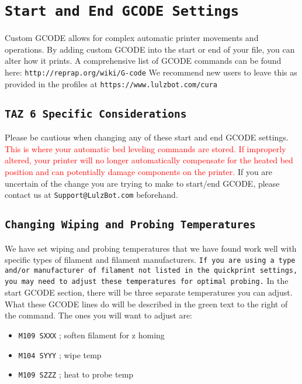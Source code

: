 \section{\texttt{Start and End GCODE Settings}}
Custom GCODE allows for complex automatic printer movements and operations. By adding custom GCODE into the start or end of your file, you can alter how it prints. A comprehensive list of GCODE commands can be found here: \texttt{http://reprap.org/wiki/G-code} We recommend new users to leave this as provided in the profiles at \texttt{https://www.lulzbot.com/cura}

\subsection{\texttt{TAZ 6 Specific Considerations}}
Please be cautious when changing any of these start and end GCODE settings. \textcolor{red}{This is where your automatic bed leveling commands are stored. If improperly altered, your printer will no longer automatically compensate for the heated bed position and can potentially damage components on the printer.} If you are uncertain of the change you are trying to make to start/end GCODE, please contact us at \texttt{Support@LulzBot.com} beforehand.


\subsection{\texttt{Changing Wiping and Probing Temperatures}} \label{sssec:num1}
We have set wiping and probing temperatures that we have found work well with specific types of filament and filament manufacturers. \texttt{If you are using a type and/or manufacturer of filament not listed in the quickprint settings, you may need to adjust these temperatures for optimal probing.} In the start GCODE section, there will be three separate temperatures you can adjust. What these GCODE lines do will be described in the \textcolor{green2}{green text} to the right of the command. The ones you will want to adjust are:
\begin{itemize}
\item \texttt{M109 SXXX}                    \textcolor{green2}{; soften filament for z homing}
\item \texttt{M104 SYYY}                    \textcolor{green2}{; wipe temp}
\item \texttt{M109 SZZZ}                    \textcolor{green2}{; heat to probe temp}
\end{itemize}


